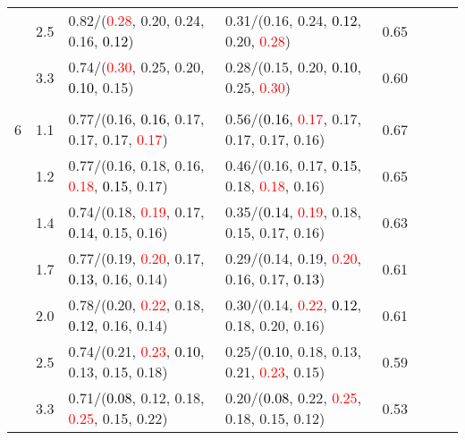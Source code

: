 \documentclass[10pt,a4paper]{report}
\begin{document}
\begin{table}[!htbp]
\begin{center}
{\begin{tabular}{ccllcccc}
			&2.5&0.82/(\textcolor{red}{0.28}, 0.20, 0.24, 0.16, \textcolor{black}{0.12})&0.31/(0.16, 0.24, \textcolor{black}{0.12}, 0.20, \textcolor{red}{0.28})&0.65\\
			&3.3&0.74/(\textcolor{red}{0.30}, 0.25, 0.20, \textcolor{black}{0.10}, 0.15)&0.28/(0.15, 0.20, \textcolor{black}{0.10}, 0.25, \textcolor{red}{0.30})&0.60\\
			&&&&\\
			6			&1.1&0.77/(0.16, \textcolor{black}{0.16}, 0.17, 0.17, 0.17, \textcolor{red}{0.17})&0.56/(\textcolor{black}{0.16}, \textcolor{red}{0.17}, 0.17, 0.17, 0.17, 0.16)&0.67\\
			&1.2&0.77/(0.16, 0.18, 0.16, \textcolor{red}{0.18}, \textcolor{black}{0.15}, 0.17)&0.46/(0.16, 0.17, \textcolor{black}{0.15}, 0.18, \textcolor{red}{0.18}, 0.16)&0.65\\
			&1.4&0.74/(0.18, \textcolor{red}{0.19}, 0.17, \textcolor{black}{0.14}, 0.15, 0.16)&0.35/(\textcolor{black}{0.14}, \textcolor{red}{0.19}, 0.18, 0.15, 0.17, 0.16)&0.63\\
			&1.7&0.77/(0.19, \textcolor{red}{0.20}, 0.17, \textcolor{black}{0.13}, 0.16, 0.14)&0.29/(0.14, 0.19, \textcolor{red}{0.20}, 0.16, 0.17, \textcolor{black}{0.13})&0.61\\
			&2.0&0.78/(0.20, \textcolor{red}{0.22}, 0.18, \textcolor{black}{0.12}, 0.16, 0.14)&0.30/(0.14, \textcolor{red}{0.22}, \textcolor{black}{0.12}, 0.18, 0.20, 0.16)&0.61\\
			&2.5&0.74/(0.21, \textcolor{red}{0.23}, \textcolor{black}{0.10}, 0.13, 0.15, 0.18)&0.25/(\textcolor{black}{0.10}, 0.18, 0.13, 0.21, \textcolor{red}{0.23}, 0.15)&0.59\\
			&3.3&0.71/(\textcolor{black}{0.08}, 0.12, 0.18, \textcolor{red}{0.25}, 0.15, 0.22)&0.20/(\textcolor{black}{0.08}, 0.22, \textcolor{red}{0.25}, 0.18, 0.15, 0.12)&0.53\\
			\bottomrule
		\end{tabular}}
	\end{center}
\end{table}
\end{document}
